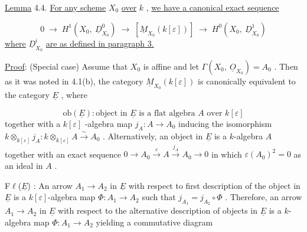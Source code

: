 \underline{Lemma} 4.4.  \underline{For any scheme} $X_0$ \underline{over} $k$ , \underline{we have a canonical exact sequence}

\begin{equation*}
0 \;\to\; H^{1}(X_{0},\ \underline{D}^{0}_{X_{0}}) \;\to\; [\underline{M}_{X_{0}}(k[\varepsilon])] \;\to\; H^{0}(X_{0},\ \underline{D}^{1}_{X_{0}})
\end{equation*}
\underline{where} $\underline{D}^{i}_{X_{0}}$ \underline{are as defined in paragraph 3.}

\underline{Proof}:  (Special case)  Assume that $X_{0}$ is affine and let $\Gamma(X_{0},\ \underline{O}_{X_{0}}) = A_{0}$ . Then as it was noted in 4.1(b), the category $\underline{M}_{X_{0}}(k[\varepsilon])$ is canonically equivalent to the category $\underline{E}$ , where

\begin{equation*}
\mathrm{ob}(\underline{E}) : \text{object in } \underline{E} \text{ is a flat algebra } A \text{ over } k[\varepsilon]
\end{equation*}
together with a  $k[\varepsilon]$ -algebra map  $j_{A} : A \to A_{0}$  inducing the isomorphism $k \otimes_{k[\varepsilon]} j_{A} : k \otimes_{k[\varepsilon]} A \overset{\sim}{\longrightarrow} A_{0}$ . Alternatively, an object in $\underline{E}$ is a $k$-algebra $A$  together with an exact sequence  $0 \to A_{0} \overset{\varepsilon}{\longrightarrow} A \overset{j_{A}}{\longrightarrow} A_{0} \to 0$  in which $\varepsilon(A_{0})^{2} = 0$  as an ideal in  $A$ .

F$\ell$($\underline{E}$) :  An arrow  $A_{1} \to A_{2}$  in  $\underline{E}$  with respect to first description of the object in  $\underline{E}$  is a  $k[\varepsilon]$-algebra map  $\Phi : A_{1} \to A_{2}$  such that  $j_{A_{1}} = j_{A_{2}} \circ \Phi$ . Therefore, an arrow  $A_{1} \to A_{2}$  in  $\underline{E}$  with respect to the alternative description of objects in  $\underline{E}$  is a $k$-algebra map  $\Phi : A_{1} \to A_{2}$  yielding a commutative diagram


